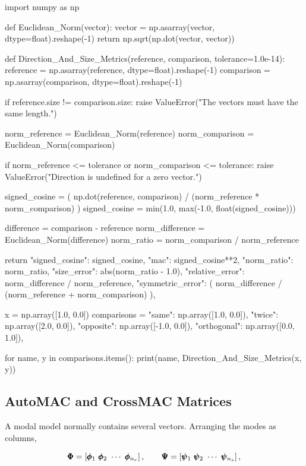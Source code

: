 \begin{python}
import numpy as np


def Euclidean_Norm(vector):
    vector = np.asarray(vector, dtype=float).reshape(-1)
    return np.sqrt(np.dot(vector, vector))


def Direction_And_Size_Metrics(reference, comparison,
                               tolerance=1.0e-14):
    reference = np.asarray(reference, dtype=float).reshape(-1)
    comparison = np.asarray(comparison, dtype=float).reshape(-1)

    if reference.size != comparison.size:
        raise ValueError("The vectors must have the same length.")

    norm_reference = Euclidean_Norm(reference)
    norm_comparison = Euclidean_Norm(comparison)

    if norm_reference <= tolerance or norm_comparison <= tolerance:
        raise ValueError("Direction is undefined for a zero vector.")

    signed_cosine = (
        np.dot(reference, comparison)
        / (norm_reference * norm_comparison)
    )
    signed_cosine = min(1.0, max(-1.0, float(signed_cosine)))

    difference = comparison - reference
    norm_difference = Euclidean_Norm(difference)
    norm_ratio = norm_comparison / norm_reference

    return {
        "signed_cosine": signed_cosine,
        "mac": signed_cosine**2,
        "norm_ratio": norm_ratio,
        "size_error": abs(norm_ratio - 1.0),
        "relative_error": norm_difference / norm_reference,
        "symmetric_error": (
            norm_difference / (norm_reference + norm_comparison)
        ),
    }


x = np.array([1.0, 0.0])
comparisons = {
    "same": np.array([1.0, 0.0]),
    "twice": np.array([2.0, 0.0]),
    "opposite": np.array([-1.0, 0.0]),
    "orthogonal": np.array([0.0, 1.0]),
}

for name, y in comparisons.items():
    print(name, Direction_And_Size_Metrics(x, y))
\end{python}


\subsection{AutoMAC and CrossMAC Matrices}

A modal model normally contains several vectors. Arranging the modes as columns,

\begin{equation}
    \M{\Phi}=
    \left[\M{\phi}_1\ \M{\phi}_2\ \cdots\ \M{\phi}_{n_r}\right],
    \qquad
    \M{\Psi}=
    \left[\M{\psi}_1\ \M{\psi}_2\ \cdots\ \M{\psi}_{n_s}\right],
\end{equation}

